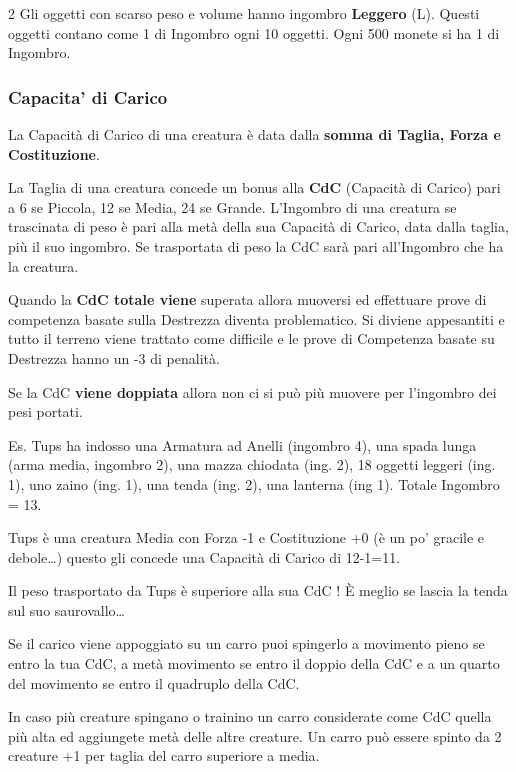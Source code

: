 \begin{multicols}{2}
Gli oggetti con scarso peso e volume hanno ingombro \textbf{Leggero} (L). Questi oggetti contano come 1 di Ingombro ogni 10 oggetti. Ogni 500 monete si ha 1 di Ingombro.

\subsubsection{Capacita' di Carico}\label{capacitadicarico}

La Capacità di Carico di una creatura è data dalla \textbf{somma di Taglia, Forza e Costituzione}.

La Taglia di una creatura concede un bonus alla \textbf{CdC} (Capacità di Carico) pari a 6 se Piccola, 12 se Media, 24 se Grande. L'Ingombro di una creatura se trascinata di peso è pari alla metà della sua Capacità di Carico, data dalla taglia, più il suo ingombro. Se trasportata di peso la CdC sarà pari all'Ingombro che ha la creatura.

Quando la \textbf{CdC totale viene} superata allora muoversi ed effettuare prove di competenza basate sulla Destrezza diventa problematico. Si diviene appesantiti e tutto il terreno viene trattato come difficile e le prove di Competenza basate su Destrezza hanno un -3 di penalità.

Se la CdC \textbf{viene doppiata} allora non ci si può più muovere per l'ingombro dei pesi portati.

Es. Tups ha indosso una Armatura ad Anelli (ingombro 4), una spada lunga (arma media, ingombro 2), una mazza chiodata (ing. 2), 18 oggetti leggeri (ing. 1), uno zaino (ing. 1), una tenda (ing. 2), una lanterna (ing 1). Totale Ingombro = 13.

Tups è una creatura Media con Forza -1 e Costituzione +0 (è un po' gracile e debole…) questo gli concede una Capacità di Carico di 12-1=11.

Il peso trasportato da Tups è superiore alla sua CdC ! È meglio se lascia la tenda sul suo saurovallo…

Se il carico viene appoggiato su un carro puoi spingerlo a movimento pieno se entro la tua CdC, a metà movimento se entro il doppio della CdC e a un quarto del movimento se entro il quadruplo della CdC.

In caso più creature spingano o trainino un carro considerate come CdC quella più alta ed aggiungete metà delle altre creature. Un carro può essere spinto da 2 creature +1 per taglia del carro superiore a media.


\end{multicols}
